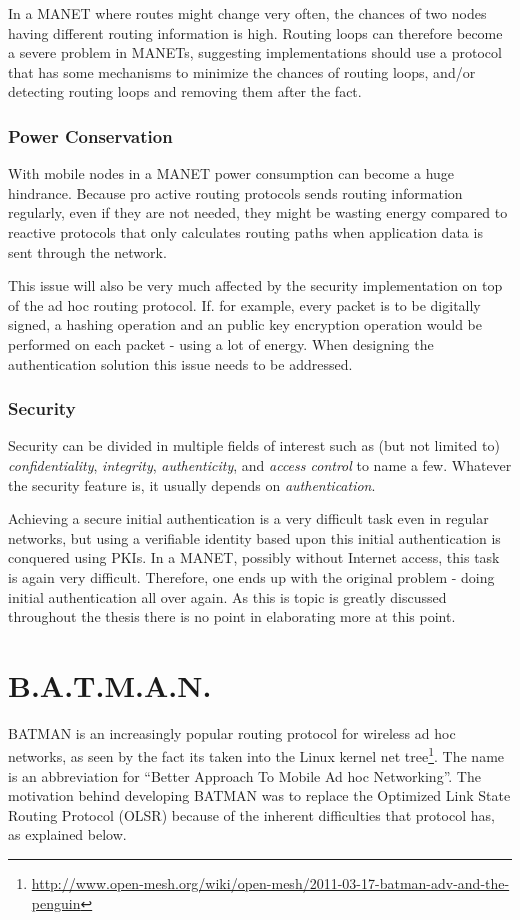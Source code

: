 In a \ac{MANET} where routes might change very often, the chances of two nodes
having different routing information is high. Routing loops can therefore become
a severe problem in \acp{MANET}, suggesting implementations should use a
protocol that has some mechanisms to minimize the chances of routing loops,
and/or detecting routing loops and removing them after the fact.

\subsubsection*{Power Conservation}
With mobile nodes in a \ac{MANET} power consumption can become a huge hindrance.
Because pro active routing protocols sends routing information regularly, even
if they are not needed, they might be wasting energy compared to reactive
protocols that only calculates routing paths when application data is sent
through the network.

This issue will also be very much affected by the security implementation on top
of the ad hoc routing protocol. If. for example, every packet is to be digitally
signed, a hashing operation and an public key encryption operation would be
performed on each packet - using a lot of energy. When designing the
authentication solution this issue needs to be addressed.

\subsubsection*{Security}
Security can be divided in multiple fields of interest such as (but not limited
to) \textit{confidentiality}, \textit{integrity}, \textit{authenticity}, and
\textit{access control} to name a few. Whatever the security feature is, it
usually depends on \emph{authentication}.

Achieving a secure initial authentication is a very difficult task even in
regular networks, but using a verifiable identity based upon this initial
authentication is conquered using \acp{PKI}. In a \ac{MANET}, possibly without
Internet access, this task is again very difficult. Therefore, one ends
up with the original problem - doing initial authentication all over again. As this
is topic is greatly discussed throughout the thesis there is no point in
elaborating more at this point.

\section{B.A.T.M.A.N.}
BATMAN \cite{batman_rfc} is an increasingly popular routing protocol for
wireless ad hoc networks, as seen by the fact its taken into the Linux kernel
net tree\footnote{\url{http://www.open-mesh.org/wiki/open-mesh/2011-03-17-batman-adv-and-the-penguin}}.
The name is an abbreviation for ``Better Approach To Mobile Ad hoc
Networking''. The motivation behind developing BATMAN was to replace the
Optimized Link State Routing Protocol (OLSR) \cite{why-starting-batman} because
of the inherent difficulties that protocol has, as explained below.

